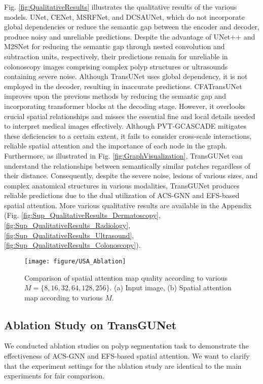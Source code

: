 Fig. \ref{fig:QualitativeResults} illustrates the qualitative results of the various models. UNet, CENet, MSRFNet, and DCSAUNet, which do not incorporate global dependencies or reduce the semantic gap between the encoder and decoder, produce noisy and unreliable predictions. Despite the advantage of UNet++ and M2SNet for reducing the semantic gap through nested convolution and subtraction units, respectively, their predictions remain for unreliable in colonoscopy images comprising complex polyp structures or ultrasounds containing severe noise. Although TransUNet uses global dependency, it is not employed in the decoder, resulting in inaccurate predictions. CFATransUNet improves upon the previous methods by reducing the semantic gap and incorporating transformer blocks at the decoding stage. However, it overlooks crucial spatial relationships and misses the essential fine and local details needed to interpret medical images effectively. Although PVT-GCASCADE mitigates these deficiencies to a certain extent, it fails to consider cross-scale interactions, reliable spatial attention and the importance of each node in the graph. Furthermore, as illustrated in Fig. \ref{fig:GraphVisualization}, TransGUNet can understand the relationships between semantically similar patches regardless of their distance. Consequently, despite the severe noise, lesions of various sizes, and complex anatomical structures in various modalities, TransGUNet produces reliable predictions due to the dual utilization of ACS-GNN and EFS-based spatial attention. More various qualitative results are available in the Appendix (Fig. \ref{fig:Sup_QualitativeResults_Dermatoscopy}, \ref{fig:Sup_QualitativeResults_Radiology}, \ref{fig:Sup_QualitativeResults_Ultrasound}, \ref{fig:Sup_QualitativeResults_Colonoscopy}).

\begin{figure}[t]
    \centering
    \texttt{[image: figure/USA\_Ablation]}
    \caption{Comparison of spatial attention map quality according to various $M = \{ 8, 16, 32, 64, 128, 256 \}$. (a) Input image, (b) Spatial attention map according to various $M$.} \vspace{-0.25cm}
    \label{fig:USA_Ablation}
\end{figure}

\subsection{Ablation Study on TransGUNet}
We conducted ablation studies on polyp segmentation task to demonstrate the effectiveness of ACS-GNN and EFS-based spatial attention. We want to clarify that the experiment settings for the ablation study are identical to the main experiments for fair comparison.

